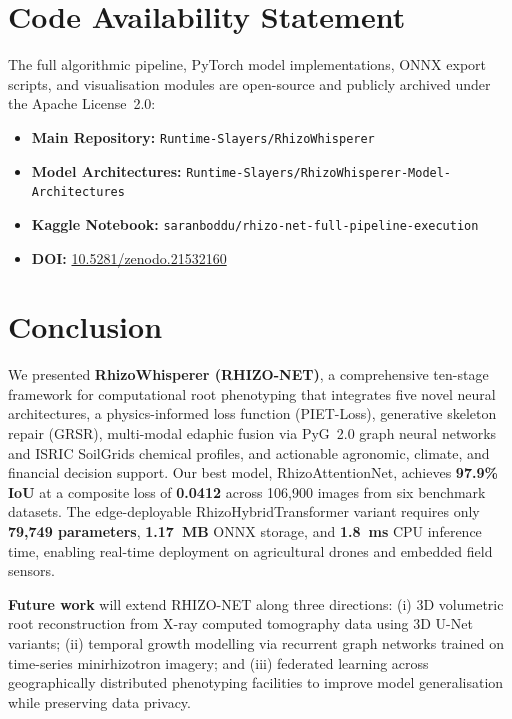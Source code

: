 \documentclass[final,3p,times,nonatbib]{elsarticle}
\begin{document}
\section*{Code Availability Statement}
The full algorithmic pipeline, PyTorch model implementations, ONNX export scripts, and visualisation modules are open-source and publicly archived under the Apache License~2.0:
\begin{itemize}
    \item \textbf{Main Repository:} \texttt{Runtime-Slayers/RhizoWhisperer}~\cite{sepas1609_rhizowhisperer}
    \item \textbf{Model Architectures:} \texttt{Runtime-Slayers/RhizoWhisperer-Model-Architectures}~\cite{sepas1609_architectures}
    \item \textbf{Kaggle Notebook:} \texttt{saranboddu/rhizo-net-full-pipeline-execution}
    \item \textbf{DOI:} \href{https://doi.org/10.5281/zenodo.21532160}{10.5281/zenodo.21532160}
\end{itemize}


\section{Conclusion}
\label{sec:conclusion}

We presented \textbf{RhizoWhisperer (RHIZO-NET)}, a comprehensive ten-stage framework for computational root phenotyping that integrates five novel neural architectures, a physics-informed loss function (PIET-Loss), generative skeleton repair (GRSR), multi-modal edaphic fusion via PyG~2.0 graph neural networks and ISRIC SoilGrids chemical profiles, and actionable agronomic, climate, and financial decision support. Our best model, RhizoAttentionNet, achieves \textbf{97.9\% IoU} at a composite loss of \textbf{0.0412} across 106,900 images from six benchmark datasets. The edge-deployable RhizoHybridTransformer variant requires only \textbf{79,749 parameters}, \textbf{1.17~MB} ONNX storage, and \textbf{1.8~ms} CPU inference time, enabling real-time deployment on agricultural drones and embedded field sensors.

\textbf{Future work} will extend RHIZO-NET along three directions: (i) 3D volumetric root reconstruction from X-ray computed tomography data using 3D U-Net variants; (ii) temporal growth modelling via recurrent graph networks trained on time-series minirhizotron imagery; and (iii) federated learning across geographically distributed phenotyping facilities to improve model generalisation while preserving data privacy.

\printbibliography
\end{document}
